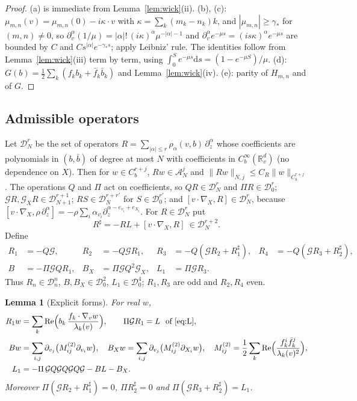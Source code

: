 \documentclass[11pt]{article}
\newcommand{\dd}{\mathrm{d}}
\newcommand{\cG}{\mathcal{G}}
\newcommand{\cA}{\mathcal{A}}
\newcommand{\cD}{\mathcal{D}}
\newcommand{\R}{\mathbb{R}}
\renewcommand{\Re}{\operatorname{Re}}
\newcommand{\nrm}[2]{\|#1\|_{#2}}
\newtheorem{lemma}[theorem]{Lemma}
\theoremstyle{remark}
\begin{document}
\begin{proof}
(a) is immediate from Lemma~\ref{lem:wick}(ii). (b), (c):
$\mu_{m,n}(v)=\mu_{m,n}(0)-i\kappa\cdot v$ with
$\kappa=\sum_k(m_k-n_k)k$, and $|\mu_{m,n}|\ge\gamma_*$ for $(m,n)\ne0$, so
$\partial_v^\alpha(1/\mu)=|\alpha|!\,(i\kappa)^\alpha\mu^{-|\alpha|-1}$ and
$\partial_v^\alpha e^{-\mu s}=(is\kappa)^\alpha e^{-\mu s}$ are bounded by
$C$ and $C s^{|\alpha|}e^{-\gamma_*s}$; apply Leibniz' rule. The identities
follow from Lemma~\ref{lem:wick}(iii) term by term, using
$\int_0^Se^{-\mu s}\dd s=(1-e^{-\mu S})/\mu$. (d): $G(b)=\frac12\sum_k(f_kb_k+
\bar f_k\bar b_k)$ and Lemma~\ref{lem:wick}(iv). (e): parity of $H_{m,n}$
and of $G$.
\end{proof}

\subsection{Admissible operators}

Let $\cD_N^r$ be the set of operators
$R=\sum_{|\alpha|\le r}\rho_\alpha(v,b)\,\partial_z^\alpha$ whose coefficients
are polynomials in $(b,\bar b)$ of degree at most $N$ with coefficients in
$C_b^\infty(\R^d_v)$ (no dependence on $X$). Then for $w\in C_b^{r+j}$,
$Rw\in\cA_N^j$ and $\nrm{Rw}{N,j}\le C_R\nrm{w}{C_b^{r+j}}$. The operations
$Q$ and $\Pi$ act on coefficients, so $QR\in\cD_N^r$ and
$\Pi R\in\cD_0^r$; $\cG R,\cG_XR\in\cD_{N+1}^{r+1}$; $RS\in\cD_N^{r+r'}$
for $S\in\cD_0^{r'}$; and
$[v\cdot\nabla_X,R]\in\cD_N^r$, because
$[v\cdot\nabla_X,\rho\,\partial_z^\alpha]
=-\rho\sum_i\alpha_{v_i}\partial_z^{\alpha-e_{v_i}+e_{X_i}}$. For
$R\in\cD_N^r$ put
\begin{equation}
  R^\sharp=-RL+[v\cdot\nabla_X,R]\ \in\cD_N^{r+2}.
\end{equation}
Define
\begin{equation}
\begin{aligned}
  R_1&=-Q\cG, & R_2&=-Q\cG R_1, & R_3&=-Q(\cG R_2+R_1^\sharp), &
  R_4&=-Q(\cG R_3+R_2^\sharp),\\
  B&=-\Pi\cG QR_1, & B_X&=\Pi\cG Q^2\cG_X, &
  L_1&=\Pi\cG R_3 .
\end{aligned}
\label{eq:ops}
\end{equation}
Thus $R_n\in\cD_n^n$, $B,B_X\in\cD_0^2$, $L_1\in\cD_0^4$; $R_1,R_3$ are
odd and $R_2,R_4$ even.

\begin{lemma}[Explicit forms]\label{lem:explicit}
For real $w$,
\begin{align*}
  R_1w&=\sum_k\Re\Bigl(b_k\,\frac{f_k\cdot\nabla_vw}{\lambda_k(v)}\Bigr),
  \qquad \Pi\cG R_1=L\ \text{ of \eqref{eq:L}},\\
  Bw&=\sum_{i,j}\partial_{v_j}\bigl(M^{(2)}_{ij}\partial_{v_i}w\bigr),\quad
  B_Xw=\sum_{i,j}\partial_{v_j}\bigl(M^{(2)}_{ij}\partial_{X_i}w\bigr),\quad
  M^{(2)}_{ij}=\frac12\sum_k\Re\Bigl(\frac{f_k^i\bar f_k^j}{\lambda_k(v)^2}\Bigr),\\
  L_1&=-\Pi\,\cG Q\cG Q\cG Q\cG-BL-B_X .
\end{align*}
Moreover $\Pi(\cG R_2+R_1^\sharp)=0$, $\Pi R_2^\sharp=0$ and
$\Pi(\cG R_3+R_2^\sharp)=L_1$.
\end{lemma}
\end{document}
